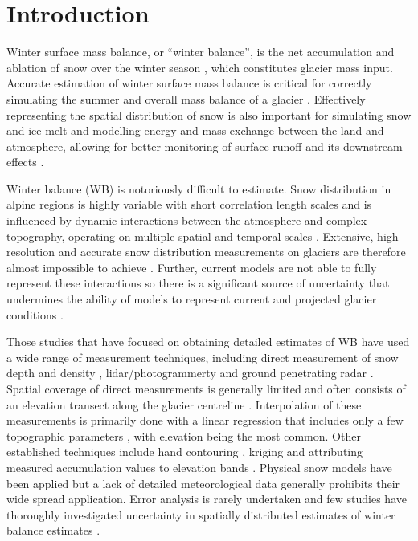 \documentclass[twocolumn, letterpaper]{igs}
\begin{document}
\section{Introduction}

Winter surface mass balance, or ``winter balance'', is the net accumulation and ablation of snow over the winter season \citep{Cogley2011}, which constitutes glacier mass input. Accurate estimation of winter surface mass balance is critical for correctly simulating the summer and overall mass balance of a glacier \citep[e.g.][]{Hock2005}. Effectively representing the spatial distribution of snow is also important for simulating snow and ice melt and modelling energy and mass exchange between the land and atmosphere, allowing for better monitoring of surface runoff and its downstream effects \citep[e.g.][]{Clark2011}.

Winter balance (WB) is notoriously difficult to estimate. Snow distribution in alpine regions is highly variable with short correlation length scales \citep[e.g.][]{Anderton2004, Egli2011, Grunewald2010, Helbig2017, Lopez2011, Lopez2013, Machguth2006, Marshall2006} and is influenced by dynamic interactions between the atmosphere and complex topography, operating on multiple spatial and temporal scales \citep[e.g.][]{Barry1992, Liston2006, Clark2011}. Extensive, high resolution and accurate snow distribution measurements on glaciers are therefore almost impossible to achieve \citep[e.g.][]{Cogley2011, McGrath2015}. Further, current models are not able to fully represent these interactions so there is a significant source of uncertainty that undermines the ability of models to represent current and projected glacier conditions \citep{Reveillet2016}. 

Those studies that have focused on obtaining detailed estimates of WB have used a wide range of measurement techniques, including direct measurement of snow depth and density \citep[e.g.][]{Cullen2017}, lidar/photogrammerty \citep[e.g.][]{Sold2013} and ground penetrating radar \citep[e.g.][]{Machguth2006, Gusmeroli2014, McGrath2015}. Spatial coverage of direct measurements is generally limited and often consists of an elevation transect along the glacier centreline \citep[e.g.][]{Kaser2003}. Interpolation of these measurements is primarily done with a linear regression that includes only a few topographic parameters \citep[e.g.][]{MacDougall2011}, with elevation being the most common. Other established techniques include hand contouring \citep[e.g.][]{Tangborn1975}, kriging \citep[e.g.][]{Hock1999} and attributing measured accumulation values to elevation bands \citep[e.g.][]{Thibert2008}. Physical snow models have been applied \citep[e.g.][]{Mott2008, Dadic2010} but a lack of detailed meteorological data generally prohibits their wide spread application. Error analysis is rarely undertaken and few studies have thoroughly investigated uncertainty in spatially distributed estimates of winter balance estimates \citep[c.f.][]{Schuler2008}. 
\end{document}
